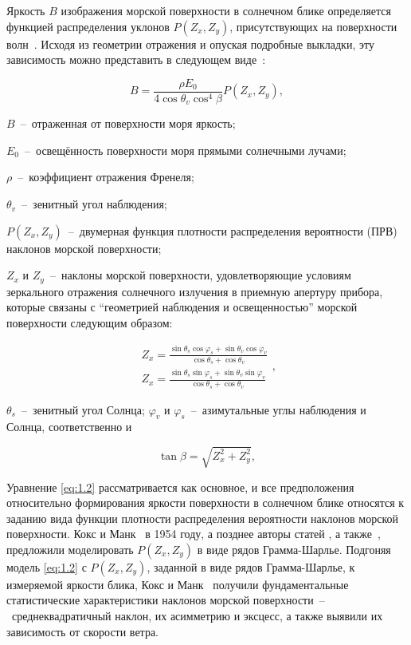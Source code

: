 Яркость $B$ изображения морской поверхности в солнечном блике определяется функцией распределения уклонов $P(Z_{x} ,Z_{y} )$, присутствующих на поверхности волн~\citep{Cox1954, Cox1954a}. Исходя из геометрии отражения и опуская подробные выкладки, эту зависимость можно представить в следующем виде~\citep{Cox1954, Cox1954a}:


\begin{equation} \label{eq:1.2} 
    B=\frac{\rho E_{0} }{4\cos \theta _{v} \cos ^{4} \beta } P(Z_{x} ,Z_{y} ), 
\end{equation} 


 $B$~--~отраженная от поверхности моря яркость;

\noindent$E_{0}$~--~освещённость поверхности моря прямыми солнечными лучами;

\noindent$\rho$~--~коэффициент отражения Френеля;

\noindent$\theta _{v}$~--~зенитный угол наблюдения;

\noindent$P(Z_{x}, Z_{y})$~--~двумерная функция плотности распределения вероятности (ПРВ) наклонов морской поверхности; 

\noindent$Z_{x} $ и $Z_{y}$~--~наклоны морской поверхности, удовлетворяющие условиям зеркального отражения солнечного излучения в приемную апертуру прибора, которые связаны с ``геометрией наблюдения и освещенностью'' морской поверхности следующим образом:


\begin{equation} \label{eq:1.3}
    \begin{array}{l} {Z_{x} =\frac{\sin \theta _{s} \cos \varphi _{s} +\sin \theta _{v} \cos \varphi _{v} }{\cos \theta _{s} +\cos \theta _{v} } } \\ {Z_{x} =\frac{\sin \theta _{s} \sin \varphi _{s} +\sin \theta _{v} \sin \varphi _{v} }{\cos \theta _{s} +\cos \theta _{v} } } \end{array},
\end{equation}



\noindent$\theta _{s} $~--~зенитный угол Солнца; $\varphi _{v} $ и $\varphi _{s} $~--~азимутальные углы наблюдения и Солнца, соответственно и


\begin{equation} \label{eq:1.4} 
    \tan \beta =\sqrt{Z_{x}^{2} +Z_{y}^{2} } , 
\end{equation} 


Уравнение \eqref{eq:1.2} рассматривается как основное, и все предположения относительно формирования яркости поверхности в солнечном блике относятся к заданию вида функции плотности распределения вероятности наклонов морской поверхности. Кокс и Манк~\citep{Cox1954, Cox1954a} в 1954 году, а позднее авторы статей \citep{Chapron2000, Ebuchi2002}, а также~\citep{Breon2006}, предложили моделировать $P(Z_{x} ,Z_{y} )$ в виде рядов Грамма-Шарлье. Подгоняя модель \eqref{eq:1.2} с $P(Z_{x} ,Z_{y} )$, заданной в виде рядов Грамма-Шарлье, к измеряемой яркости блика, Кокс и Манк~\citep{Cox1954, Cox1954a} получили фундаментальные статистические характеристики наклонов морской поверхности~--~среднеквадратичный наклон, их асимметрию и эксцесс, а также выявили их зависимость от скорости ветра.



